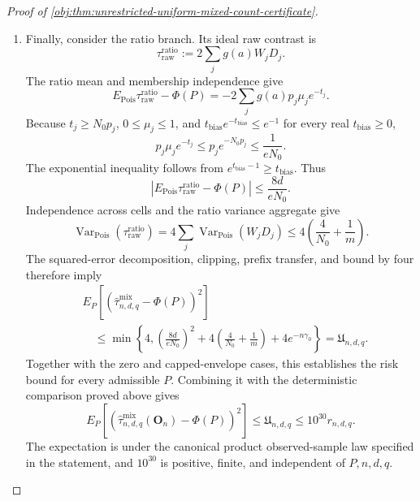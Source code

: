 \documentclass[11pt]{article}
\begin{document}
\begin{proof}[Proof of \cref{obj:thm:unrestricted-uniform-mixed-count-certificate}]
\begin{enumerate}
\item Finally, consider the ratio branch. Its ideal raw contrast is
\[
\tau_{\mathrm{raw}}^{\mathrm{ratio}}
:=2\sum_jg(a)W_jD_j.
\]
The ratio mean and membership independence give
\[
E_{\mathrm{Pois}}\tau_{\mathrm{raw}}^{\mathrm{ratio}}-\Phi(P)
=-2\sum_jg(a)p_j\mu_je^{-t_j}.
\]
Because \(t_j\ge N_0p_j\), \(0\le\mu_j\le1\), and
\(t_{\mathrm{bias}}e^{-t_{\mathrm{bias}}}\le e^{-1}\) for every real
\(t_{\mathrm{bias}}\ge0\),
\[
p_j\mu_je^{-t_j}
\le p_je^{-N_0p_j}
\le\frac1{eN_0}.
\]
The exponential inequality follows from
\(e^{t_{\mathrm{bias}}-1}\ge t_{\mathrm{bias}}\).
Thus
\[
|E_{\mathrm{Pois}}\tau_{\mathrm{raw}}^{\mathrm{ratio}}-\Phi(P)|
\le\frac{8d}{eN_0}.
\]
Independence across cells and the ratio variance aggregate give
\[
\operatorname{Var}_{\mathrm{Pois}}
(\tau_{\mathrm{raw}}^{\mathrm{ratio}})
=
4\sum_j\operatorname{Var}_{\mathrm{Pois}}(W_jD_j)
\le4\left(\frac4{N_0}+\frac1m\right).
\]
The squared-error decomposition, clipping, prefix transfer, and bound by
four therefore imply
\[
\begin{aligned}
&E_P\!\left[
(\widehat\tau^{\mathrm{mix}}_{n,d,q}-\Phi(P))^2
\right]\\
&\quad\le
\min\left\{4,
\left(\frac{8d}{eN_0}\right)^2
+4\left(\frac4{N_0}+\frac1m\right)
+4e^{-n\gamma_0}\right\}
=\mathfrak U_{n,d,q}.
\end{aligned}
\]
Together with the zero and capped-envelope cases, this establishes the
risk bound for every admissible \(P\). Combining it with the deterministic
comparison proved above gives
\[
E_P\!\left[
\left(\widehat\tau^{\mathrm{mix}}_{n,d,q}(\mathbf O_n)-\Phi(P)\right)^2
\right]
\le\mathfrak U_{n,d,q}
\le10^{30}r_{n,d,q}.
\]
The expectation is under the canonical product observed-sample law
specified in the statement, and \(10^{30}\) is positive, finite, and
independent of \(P,n,d,q\).
\end{enumerate}
\end{proof}
\end{document}
